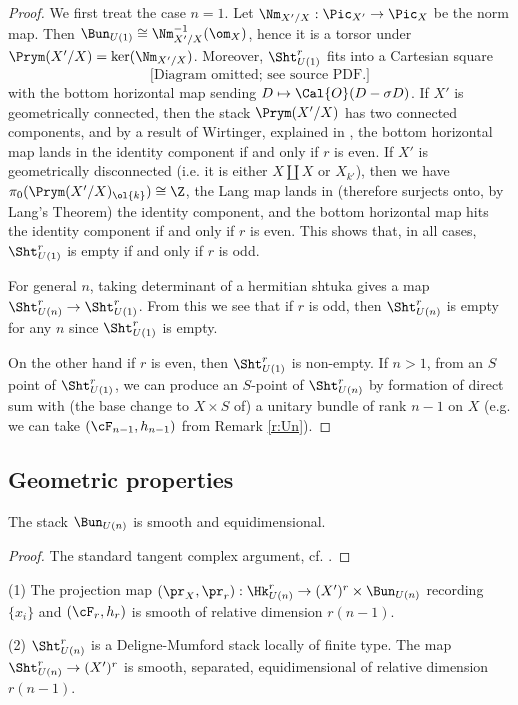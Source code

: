 \begin{proof} We first treat the case $n=1$. Let $\Nm_{X'/X}: \Pic_{X'}\to \Pic_{X}$ be the norm map. Then $\Bun_{U(1)}\cong \Nm^{-1}_{X'/X}(\om_{X})$, hence it is a torsor under $\Prym(X'/X)=\ker(\Nm_{X'/X})$. Moreover, $\Sht_{U(1)}^r$ fits into a Cartesian square
\[
\text{[Diagram omitted; see source PDF.]}
\]
with the bottom horizontal map sending $D \mapsto  \Cal{O}(D - \sigma D )$. If $X'$ is geometrically connected, then the stack $\Prym(X'/X)$ has two connected components, and by a result of Wirtinger, explained in \cite[\S 2]{Mum71}, the bottom horizontal map lands in the identity component if and only if $r$ is even. If $X'$ is geometrically disconnected (i.e. it is either $X \coprod X$ or $X_{k'}$), then we have $\pi_0(\Prym(X'/X)_{\ol{k}}) \cong \Z$, the Lang map lands in (therefore surjects onto, by Lang's Theorem) the identity component, and the bottom horizontal map hits the identity component if and only if $r$ is even. This shows that, in all cases, $\Sht_{U(1)}^r$ is empty if and only if $r$ is odd.

For general $n$, taking determinant of a hermitian shtuka gives a map $\Sht^{r}_{U(n)}\to \Sht^{r}_{U(1)}$. From this we see that if $r$ is odd, then $\Sht_{U(n)}^r$ is empty for any $n$ since $\Sht^{r}_{U(1)}$ is empty.

On the other hand if $r$ is even, then $\Sht_{U(1)}^r$ is non-empty. If $n>1$, from an $S$ point of $\Sht_{U(1)}^r$, we can produce an $S$-point of $\Sht_{U(n)}^r$ by formation of direct sum with (the base change to $X\times S$ of) a unitary bundle of rank $n-1$ on $X$ (e.g. we can take $(\cF_{n-1},h_{n-1})$ from Remark \ref{r:Un}).
\end{proof}



\subsection{Geometric properties}


\begin{lemma}
\notready\label{lem: smooth Bun_G}
The stack $\Bun_{U(n)}$ is smooth and equidimensional.
\end{lemma}

\begin{proof}
The standard tangent complex argument, cf. \cite[Prop. 1]{Hei10}.
\end{proof}

\begin{lemma}
\notready\label{lem: shtuka geometry}
(1) The projection map $(\pr_{X}, \pr_{r}):\Hk_{U(n)}^r \rightarrow (X')^r \times \Bun_{U(n)}$ recording $\{x_{i}\}$ and $(\cF_{r},h_{r})$ is smooth of relative dimension $r(n-1)$.

(2) $\Sht_{U(n)}^r$ is a Deligne-Mumford stack locally of finite type. The map $\Sht_{U(n)}^r \rightarrow (X')^r$ is smooth, separated, equidimensional of relative dimension $r(n-1)$.
\end{lemma}

